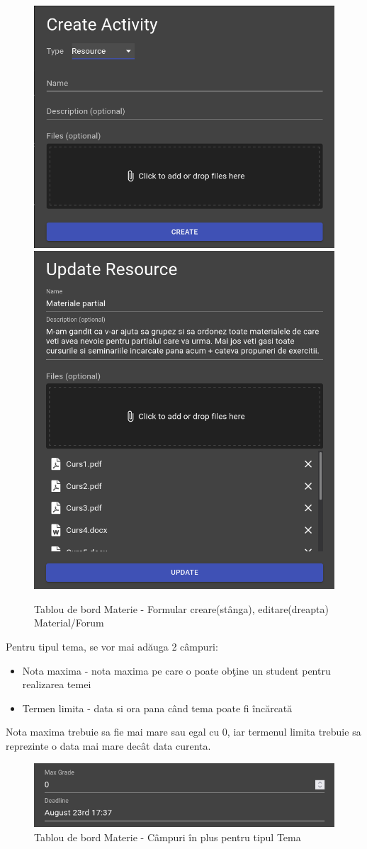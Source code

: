 \documentclass[12pt, a4paper, oneside, romanian]{teza-upb}
\begin{document}
\begin{figure}[H]
\centering
\includegraphics*[width=0.45\columnwidth]{tablou-de-bord-materie-formular-creare-material}
\includegraphics*[width=0.45\columnwidth]{tablou-de-bord-materie-formular-editare-material}
\caption{Tablou de bord Materie - Formular creare(stânga), editare(dreapta) Material/Forum}
\label{tablou-de-bord-materie-formular-material}
\end{figure}

Pentru tipul tema, se vor mai adăuga 2 câmpuri:
\begin{itemize}
	\item Nota maxima - nota maxima pe care o poate obţine un student pentru realizarea temei
	\item Termen limita - data si ora pana când tema poate fi încărcată
\end{itemize}
Nota maxima trebuie sa fie mai mare sau egal cu 0, iar termenul limita trebuie sa reprezinte o data mai mare decât data curenta.

\begin{figure}[H]
\centering
\includegraphics*[width=0.8\columnwidth]{tablou-de-bord-materie-campuri-tema}
\caption{Tablou de bord Materie - Câmpuri în plus pentru tipul Tema}
\label{tablou-de-bord-materie-campuri-tema}
\end{figure}
\end{document}
